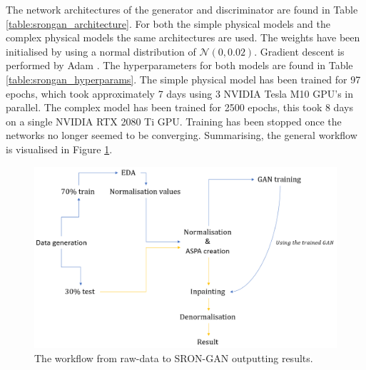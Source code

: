 The network architectures of the generator and discriminator are found in Table \ref{table:srongan_architecture}. For both the simple physical models and the complex physical models the same architectures are used. The weights have been initialised by using a normal distribution of $\mathcal{N}(0,0.02)$. Gradient descent is performed by Adam \cite{kingma2014adam}. The hyperparameters for both models are found in Table \ref{table:srongan_hyperparams}. The simple physical model has been trained for 97 epochs, which took approximately 7 days using 3 NVIDIA Tesla M10 GPU's in parallel. The complex model has been trained for 2500 epochs, this took 8 days on a single NVIDIA RTX 2080 Ti GPU. Training has been stopped once the networks no longer seemed to be converging. Summarising, the general workflow is visualised in Figure \ref{fig:workflow}.

\begin{figure} [!htb]
    \centering
    \includegraphics[scale=0.5]{figuren/wannabe_flowchart.png}
    \caption{The workflow from raw-data to SRON-GAN outputting results.}
    \label{fig:workflow}
\end{figure}








